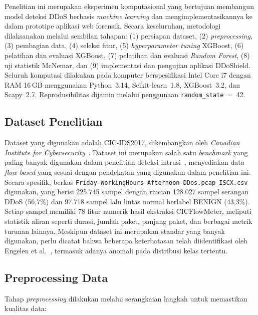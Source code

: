 \documentclass[conference,a4paper]{IEEEtran}
\begin{document}
Penelitian ini merupakan eksperimen komputasional yang bertujuan membangun model deteksi DDoS berbasis \textit{machine learning} dan mengimplementasikannya ke dalam prototipe aplikasi web forensik. Secara keseluruhan, metodologi dilaksanakan melalui sembilan tahapan: (1) persiapan dataset, (2) \textit{preprocessing}, (3) pembagian data, (4) seleksi fitur, (5) \textit{hyperparameter tuning} XGBoost, (6) pelatihan dan evaluasi XGBoost, (7) pelatihan dan evaluasi \textit{Random Forest}, (8) uji statistik McNemar, dan (9) implementasi dan pengujian aplikasi DDoShield. Seluruh komputasi dilakukan pada komputer berspesifikasi Intel Core i7 dengan RAM 16\,GB menggunakan Python~3.14, Scikit-learn~1.8, XGBoost~3.2, dan Scapy~2.7. Reprodusibilitas dijamin melalui penggunaan \texttt{random\_state}~=~42.

\subsection{Dataset Penelitian}

Dataset yang digunakan adalah CIC-IDS2017, dikembangkan oleh \textit{Canadian Institute for Cybersecurity}~\cite{ref_sharafaldin2018}. Dataset ini merupakan salah satu \textit{benchmark} yang paling banyak digunakan dalam penelitian deteksi intrusi~\cite{ref_leevy2020}, menyediakan data \textit{flow-based} yang sesuai dengan pendekatan yang digunakan dalam penelitian ini. Secara spesifik, berkas \texttt{\small Friday-\allowbreak WorkingHours-\allowbreak Afternoon-\allowbreak DDos.\allowbreak pcap\_ISCX.csv} digunakan, yang berisi 225.745 sampel dengan rincian 128.027 sampel serangan DDoS (56,7\%) dan 97.718 sampel lalu lintas normal berlabel BENIGN (43,3\%). Setiap sampel memiliki 78 fitur numerik hasil ekstraksi CICFlowMeter, meliputi statistik aliran seperti durasi, jumlah paket, panjang paket, dan berbagai metrik turunan lainnya. Meskipun dataset ini merupakan standar yang banyak digunakan, perlu dicatat bahwa beberapa keterbatasan telah diidentifikasi oleh Engelen et al.~\cite{ref_engelen2021}, termasuk adanya anomali pada distribusi kelas tertentu.

\subsection{Preprocessing Data}

Tahap \textit{preprocessing} dilakukan melalui serangkaian langkah untuk memastikan kualitas data:
\end{document}
